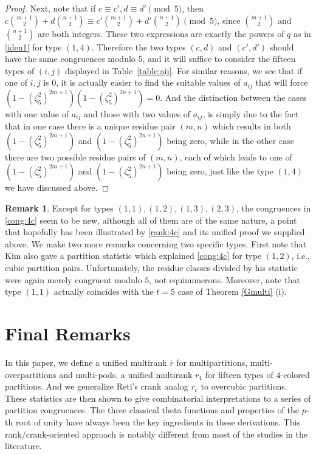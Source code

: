 \documentclass[12pt]{amsart}
\numberwithin{equation}{section}
\theoremstyle{plain}
\theoremstyle{definition}
\newtheorem{remark}[theorem]{Remark}
\begin{document}
\begin{proof}
Next, note that if $c\equiv c', d\equiv d' \pmod 5$, then $c\binom{m+1}{2}+d\binom{n+1}{2}\equiv c'\binom{m+1}{2}+d'\binom{n+1}{2} \pmod 5$, since $\binom{m+1}{2}$ and $\binom{n+1}{2}$ are both integers. These two expressions are exactly the powers of $q$ as in \eqref{iden1} for type $(1,4)$. Therefore the two types $(c,d)$ and $(c',d')$ should have the same congruences modulo $5$, and it will suffice to consider the fifteen types of $(i,j)$ displayed in Table~\ref{table:aij}. For similar reasons, we see that if one of $i,j$ is $0$, it is actually easier to find the suitable values of $a_{ij}$ that will force $(1-(\zeta_5^2)^{2m+1})(1-(\zeta_5^2)^{2n+1})=0$. And the distinction between the cases with one value of $a_{ij}$ and those with two values of $a_{ij}$, is simply due to the fact that in one case there is a unique residue pair $(m,n)$ which results in both $(1-(\zeta_5^2)^{2m+1})$ and $(1-(\zeta_5^2)^{2n+1})$ being zero, while in the other case there are two possible residue pairs of $(m,n)$, each of which leads to one of $(1-(\zeta_5^2)^{2m+1})$ and $(1-(\zeta_5^2)^{2n+1})$ being zero, just like the type $(1,4)$ we have discussed above.
\end{proof}
\begin{remark}
Except for types $(1,1),(1,2),(1,3),(2,3)$, the congruences in \eqref{cong:4c} seem to be new, although all of them are of the same nature, a point that hopefully has been illustrated by \eqref{rank:4c} and its unified proof we supplied above. We make two more remarks concerning two specific types. First note that Kim \cite{Kim3} also gave a partition statistic which explained \eqref{cong:4c} for type $(1,2)$, i.e., cubic partition pairs. Unfortunately, the residue classes divided by his statistic were again merely congruent modulo $5$, not equinumerous.
Moreover, note that type $(1,1)$ actually coincides with the $t=5$ case of Theorem \ref{Gmulti} (i).
\end{remark}



\section{Final Remarks}

In this paper, we define a unified multirank $\overline{r}$ for multipartitions, multi-overpartitions and multi-pods, a unified multirank $r_4$ for fifteen types of $4$-colored partitions. And we generalize Reti's crank analog $r_c$ to overcubic partitions. These statistics are then shown to give combinatorial interpretations to a series of partition congruences. The three classical theta functions and properties of the $p$-th root of unity have always been the key ingredients in these derivations. This rank/crank-oriented approach is notably different from most of the studies in the literature.
\end{document}
